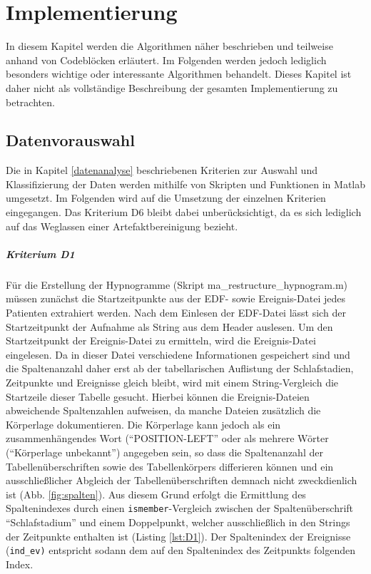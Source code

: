 \chapter{Implementierung}\label{Implementierung}

In diesem Kapitel werden die Algorithmen näher beschrieben und teilweise anhand von Codeblöcken erläutert. Im Folgenden werden jedoch lediglich besonders wichtige oder interessante Algorithmen behandelt. Dieses Kapitel ist daher nicht als vollständige Beschreibung der gesamten Implementierung zu betrachten.

\section{Datenvorauswahl}\label{Datenvorauswahl}

Die in Kapitel \ref{datenanalyse} beschriebenen Kriterien zur Auswahl und Klassifizierung der Daten werden mithilfe von Skripten und Funktionen in Matlab umgesetzt. Im Folgenden wird auf die Umsetzung der einzelnen Kriterien eingegangen. Das Kriterium D6 bleibt dabei unberücksichtigt, da es sich lediglich auf das Weglassen einer Artefaktbereinigung bezieht.

\paragraph{Kriterium D1} Für die Erstellung der Hypnogramme (Skript ma\_restructure\_hypnogram.m) müssen zunächst die Startzeitpunkte aus der \acs{EDF}- sowie Ereignis-Datei jedes Patienten extrahiert werden. Nach dem Einlesen der EDF-Datei lässt sich der Startzeitpunkt der Aufnahme als String aus dem Header auslesen. Um den Startzeitpunkt der Ereignis-Datei zu ermitteln, wird die Ereignis-Datei eingelesen. Da in dieser Datei verschiedene Informationen gespeichert sind und die Spaltenanzahl daher erst ab der tabellarischen Auflistung der Schlafstadien, Zeitpunkte und Ereignisse gleich bleibt, wird mit einem String-Vergleich die Startzeile dieser Tabelle gesucht. Hierbei können die Ereignis-Dateien abweichende Spaltenzahlen aufweisen, da manche Dateien zusätzlich die Körperlage dokumentieren. Die Körperlage kann jedoch als ein zusammenhängendes Wort ("`POSITION-LEFT"' oder als mehrere Wörter ("`Körperlage unbekannt"') angegeben sein, so dass die Spaltenanzahl der Tabellenüberschriften sowie des Tabellenkörpers differieren können und ein ausschließlicher Abgleich der Tabellenüberschriften demnach nicht zweckdienlich ist (Abb. \ref{fig:spalten}). Aus diesem Grund erfolgt die Ermittlung des Spaltenindexes durch einen \texttt{ismember}-Vergleich zwischen der Spaltenüberschrift "`Schlafstadium"' und einem Doppelpunkt, welcher ausschließlich in den Strings der Zeitpunkte enthalten ist (Listing \ref{lst:D1}). Der Spaltenindex der Ereignisse (\texttt{ind\_ev)} entspricht sodann dem auf den Spaltenindex des Zeitpunkts folgenden Index.\\

